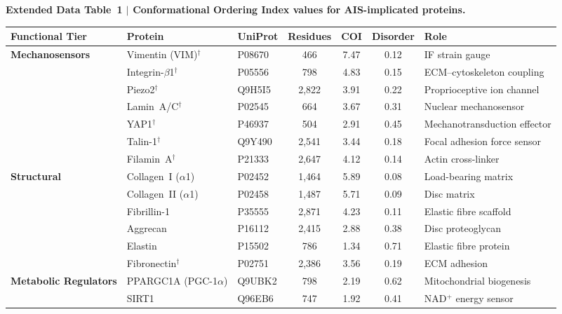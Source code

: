 \documentclass[12pt]{article}
\begin{document}
\clearpage
\begin{landscape}
\noindent\textbf{Extended Data Table~1 $\mid$ Conformational Ordering Index values for AIS-implicated proteins.}

\vspace{0.5em}
\begin{center}
\renewcommand{\arraystretch}{1.3}
{\footnotesize
\begin{tabular}{lllcccl}
\toprule
\textbf{Functional Tier} & \textbf{Protein} & \textbf{UniProt} & \textbf{Residues} & \textbf{COI} & \textbf{Disorder} & \textbf{Role} \\
\midrule
\multirow{7}{*}{\textbf{Mechanosensors}} 
 & Vimentin (VIM)$^\dagger$ & P08670 & 466 & 7.47 & 0.12 & IF strain gauge \\
 & Integrin-$\beta$1$^\dagger$ & P05556 & 798 & 4.83 & 0.15 & ECM--cytoskeleton coupling \\
 & Piezo2$^\dagger$ & Q9H5I5 & 2{,}822 & 3.91 & 0.22 & Proprioceptive ion channel \\
 & Lamin~A/C$^\dagger$ & P02545 & 664 & 3.67 & 0.31 & Nuclear mechanosensor \\
 & YAP1$^\dagger$ & P46937 & 504 & 2.91 & 0.45 & Mechanotransduction effector \\
 & Talin-1$^\dagger$ & Q9Y490 & 2{,}541 & 3.44 & 0.18 & Focal adhesion force sensor \\
 & Filamin~A$^\dagger$ & P21333 & 2{,}647 & 4.12 & 0.14 & Actin cross-linker \\
\midrule
\multirow{6}{*}{\textbf{Structural}} 
 & Collagen~I ($\alpha$1) & P02452 & 1{,}464 & 5.89 & 0.08 & Load-bearing matrix \\
 & Collagen~II ($\alpha$1) & P02458 & 1{,}487 & 5.71 & 0.09 & Disc matrix \\
 & Fibrillin-1 & P35555 & 2{,}871 & 4.23 & 0.11 & Elastic fibre scaffold \\
 & Aggrecan & P16112 & 2{,}415 & 2.88 & 0.38 & Disc proteoglycan \\
 & Elastin & P15502 & 786 & 1.34 & 0.71 & Elastic fibre protein \\
 & Fibronectin$^\dagger$ & P02751 & 2{,}386 & 3.56 & 0.19 & ECM adhesion \\
\midrule
\multirow{6}{*}{\textbf{Metabolic Regulators}} 
 & PPARGC1A (PGC-1$\alpha$) & Q9UBK2 & 798 & 2.19 & 0.62 & Mitochondrial biogenesis \\
 & SIRT1 & Q96EB6 & 747 & 1.92 & 0.41 & NAD$^+$ energy sensor \\

\end{tabular}}
\end{center}
\end{landscape}
\end{document}
